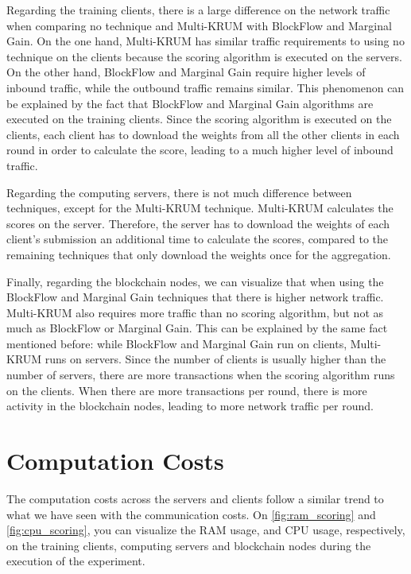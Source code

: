 Regarding the training clients, there is a large difference on the network traffic when comparing no technique and Multi-KRUM with BlockFlow and Marginal Gain. On the one hand, Multi-KRUM has similar traffic requirements to using no technique on the clients because the scoring algorithm is executed on the servers. On the other hand, BlockFlow and Marginal Gain require higher levels of inbound traffic, while the outbound traffic remains similar. This phenomenon can be explained by the fact that BlockFlow and Marginal Gain algorithms are executed on the training clients. Since the scoring algorithm is executed on the clients, each client has to download the weights from all the other clients in each round in order to calculate the score, leading to a much higher level of inbound traffic.

Regarding the computing servers, there is not much difference between techniques, except for the Multi-KRUM technique. Multi-KRUM calculates the scores on the server. Therefore, the server has to download the weights of each client's submission an additional time to calculate the scores, compared to the remaining techniques that only download the weights once for the aggregation.

Finally, regarding the blockchain nodes, we can visualize that when using the BlockFlow and Marginal Gain techniques that there is higher network traffic. Multi-KRUM also requires more traffic than no scoring algorithm, but not as much as BlockFlow or Marginal Gain. This can be explained by the same fact mentioned before: while BlockFlow and Marginal Gain run on clients, Multi-KRUM runs on servers. Since the number of clients is usually higher than the number of servers, there are more transactions when the scoring algorithm runs on the clients. When there are more transactions per round, there is more activity in the blockchain nodes, leading to more network traffic per round.

\section{Computation Costs}

The computation costs across the servers and clients follow a similar trend to what we have seen with the communication costs. On \autoref{fig:ram_scoring} and \autoref{fig:cpu_scoring}, you can visualize the RAM usage, and CPU usage, respectively, on the training clients, computing servers and blockchain nodes during the execution of the experiment.

